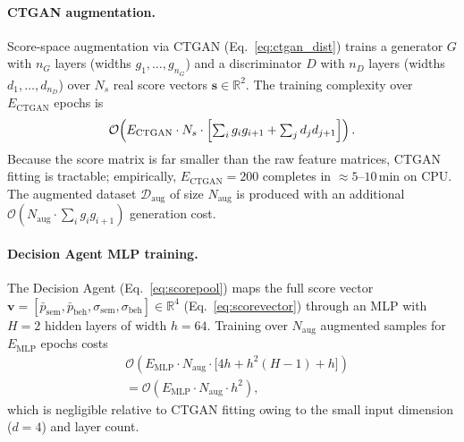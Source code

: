 \documentclass[3p]{elsarticle}
\begin{document}
\paragraph{CTGAN augmentation.}
Score-space augmentation via CTGAN (Eq.~\eqref{eq:ctgan_dist}) trains a generator $G$ with
$n_G$ layers (widths $g_1,\ldots,g_{n_G}$) and a discriminator $D$ with $n_D$ layers
(widths $d_1,\ldots,d_{n_D}$) over $N_s$ real score vectors $\mathbf{s} \in \mathbb{R}^{2}$.
The training complexity over $E_{\mathrm{CTGAN}}$ epochs is
\begin{equation}
  \mathcal{O}\!\left(E_{\mathrm{CTGAN}} \cdot N_s \cdot
  \Bigl[\textstyle\sum_{i} g_i g_{i+1} + \sum_{j} d_j d_{j+1}\Bigr]\right).
  \label{eq:ctgan_complexity}
\end{equation}
Because the score matrix is far smaller than the raw feature matrices, CTGAN fitting is
tractable; empirically, $E_{\mathrm{CTGAN}} = 200$ completes in $\approx 5$--$10$\,min on
CPU.
The augmented dataset $\mathcal{D}_{\mathrm{aug}}$ of size $N_{\mathrm{aug}}$ is produced
with an additional $\mathcal{O}(N_{\mathrm{aug}} \cdot \sum_i g_i g_{i+1})$ generation cost.

\paragraph{Decision Agent MLP training.}
The Decision Agent (Eq.~\eqref{eq:scorepool}) maps the full score vector
$\mathbf{v} = [\bar{p}_{\mathrm{sem}}, \bar{p}_{\mathrm{beh}}, \sigma_{\mathrm{sem}},
\sigma_{\mathrm{beh}}] \in \mathbb{R}^4$ (Eq.~\eqref{eq:scorevector}) through an MLP with
$H = 2$ hidden layers of width $h = 64$.
Training over $N_{\mathrm{aug}}$ augmented samples for $E_{\mathrm{MLP}}$ epochs costs
\begin{align}
  &\mathcal{O}\!\left(E_{\mathrm{MLP}} \cdot N_{\mathrm{aug}} \cdot
  \bigl[4h + h^2(H{-}1) + h\bigr]\right) \nonumber\\
  &= \mathcal{O}\!\left(E_{\mathrm{MLP}} \cdot N_{\mathrm{aug}} \cdot h^2\right),
  \label{eq:mlp_complexity}
\end{align}
which is negligible relative to CTGAN fitting owing to the small input dimension ($d=4$)
and layer count.
\end{document}
